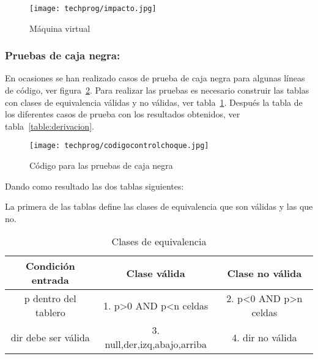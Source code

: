 \begin{figure}%
	\centering
	\texttt{[image: techprog/impacto.jpg]}
	\caption{Máquina virtual}\label{fig:impacto}
\end{figure}

\subsubsection{Pruebas de caja negra:}
En ocasiones se han realizado casos de prueba de caja negra para algunas líneas de código, ver figura~\ref{fig:codigocontrolchoque}. Para realizar las pruebas es necesario construir las tablas con clases de equivalencia válidas y no válidas, ver tabla~\ref{table:casosNegros}. Después la tabla de los diferentes casos de prueba con los resultados obtenidos, ver tabla~\ref{table:derivacion}.

\begin{figure}%
	\centering
	\texttt{[image: techprog/codigocontrolchoque.jpg]}
	\caption{Código para las pruebas de caja negra}\label{fig:codigocontrolchoque}
\end{figure}

Dando como resultado las dos tablas siguientes:

La primera de las tablas define las clases de equivalencia que son válidas y las que no.
\begin{table}[H]
	\begin{center}
		\begin{tabular}{ccc}
			\hline
			Condición entrada		& Clase válida		& Clase no válida \\ \hline
			p dentro del tablero	&1. p>0 AND p<n celdas		&2. p<0 AND p>n celdas\\
			dir debe ser válida		&3. null,der,izq,abajo,arriba		&4. dir no válida\\
		\end{tabular}
		\caption{Clases de equivalencia}
		\label{table:casosNegros}
	\end{center}
\end{table}


